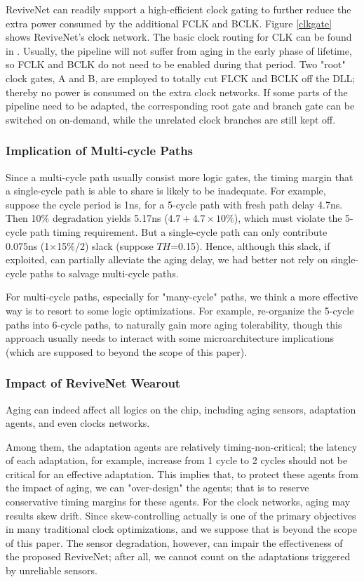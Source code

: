 ReviveNet can readily support a high-efficient clock gating to further reduce the extra power consumed by the additional FCLK and BCLK. Figure \ref{clkgate} shows ReviveNet's clock network. The basic clock routing for CLK can be found in \cite{clockpower_02}. Usually, the pipeline will not suffer from aging in the early phase of lifetime, so FCLK and BCLK do not need to be enabled during that period. Two "root" clock gates, A and B, are employed to totally cut FLCK and BCLK off the DLL; thereby no power is consumed on the extra clock networks. If some parts of the pipeline need to be adapted, the corresponding root gate and branch gate can be switched on on-demand, while the unrelated clock branches are still kept off.

\subsubsection{Implication of Multi-cycle Paths}
Since a multi-cycle path usually consist more logic gates, the timing margin that a single-cycle path is able to share is likely to be inadequate. For example, suppose the cycle period is 1ns, for a 5-cycle path with fresh path delay 4.7ns. Then 10\% degradation yields 5.17ns ($4.7+4.7\times10\%$), which must violate the 5-cycle path timing requirement. But a single-cycle path can only contribute 0.075ns (1$\times$15\%/2) slack (suppose $TH$=0.15). Hence, although this slack, if exploited, can partially alleviate the aging delay, we had better not rely on single-cycle paths to salvage multi-cycle paths.

For multi-cycle paths, especially for "many-cycle" paths, we think a more effective way is to resort to some logic optimizations. For example, re-organize the 5-cycle paths into 6-cycle paths, to naturally gain more aging tolerability, though this approach usually needs to interact with some microarchitecture implications (which are supposed to beyond the scope of this paper).

\subsubsection{Impact of ReviveNet Wearout}\label{section_impactwearout}
Aging can indeed affect all logics on the chip, including aging sensors, adaptation agents, and even clocks networks.
	
Among them, the adaptation agents are relatively timing-non-critical; the latency of each adaptation, for example, increase from 1 cycle to 2 cycles should not be critical for an effective adaptation. This implies that, to protect these agents from the impact of aging, we can "over-design" the agents; that is to reserve conservative timing margins for these agents. For the clock networks, aging may results skew drift. Since skew-controlling actually is one of the primary objectives in many traditional clock optimizations, and we suppose that is beyond the scope of this paper. The sensor degradation, however, can impair the effectiveness of the proposed ReviveNet; after all, we cannot count on the adaptations triggered by unreliable sensors.
	
